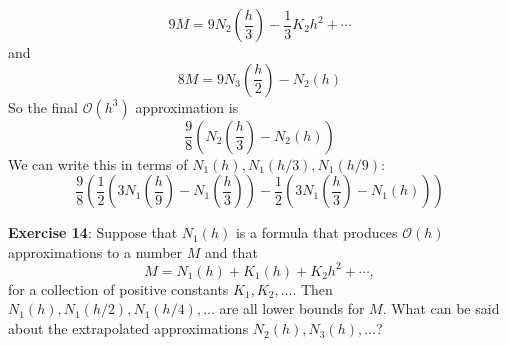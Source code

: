 \documentclass{article}
\begin{document}
\begin{answer}
\begin{equation*}
                9M = 9N_{2}\left(\dfrac{h}{3}\right) - \dfrac{1}{3}K_{2}h^{2} + \cdots
            \end{equation*}
        and
            \begin{equation*}
                8M = 9N_{3}\left(\dfrac{h}{2}\right) - N_{2}(h)
            \end{equation*}
        So the final $\mathcal{O}(h^{3})$ approximation is
            \begin{equation*}
                \dfrac{9}{8}\left(N_{2}\left(\dfrac{h}{3}\right) - N_{2}(h)\right)
            \end{equation*}
        We can write this in terms of $N_{1}(h), N_{1}(h / 3), N_{1}(h / 9)$:
            \begin{equation*}
                \dfrac{9}{8}\left(\dfrac{1}{2}\left(3N_{1}\left(\dfrac{h}{9}\right) - N_{1}\left(\dfrac{h}{3}\right)\right) - \dfrac{1}{2}\left(3N_{1}\left(\dfrac{h}{3}\right) - N_{1}(h)\right)\right)
            \end{equation*}
    \end{answer}

\textbf{Exercise 14}: Suppose that $N_{1}(h)$ is a formula that produces $\mathcal{O}(h)$ approximations to a number $M$ and that 
    \begin{equation*}
        M = N_{1}(h) + K_{1}(h) + K_{2}h^{2} + \cdots,
    \end{equation*}
for a collection of positive constants $K_{1}, K_{2}, \ldots$. Then $N_{1}(h), N_{1}(h / 2), N_{1}(h / 4), \ldots$ are all lower bounds for $M$. What can be said about the extrapolated approximations $N_{2}(h), N_{3}(h), \ldots$?
\end{document}
